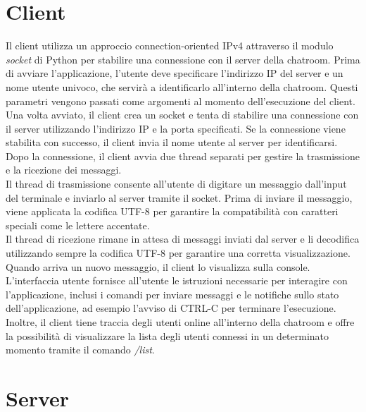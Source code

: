 \documentclass[a4paper,12pt]{report}
\begin{document}
\chapter{Client}
Il client utilizza un approccio connection-oriented IPv4 attraverso il modulo \textit{socket} di Python per stabilire una connessione con il server della chatroom. Prima di avviare l'applicazione, l'utente deve specificare l'indirizzo IP del server e un nome utente univoco, che servirà a identificarlo all'interno della chatroom. Questi parametri vengono passati come argomenti al momento dell'esecuzione del client.
\\
Una volta avviato, il client crea un socket e tenta di stabilire una connessione con il server utilizzando l'indirizzo IP e la porta specificati. Se la connessione viene stabilita con successo, il client invia il nome utente al server per identificarsi.
\\
Dopo la connessione, il client avvia due thread separati per gestire la trasmissione e la ricezione dei messaggi. 
\\
Il thread di trasmissione consente all'utente di digitare un messaggio dall'input del terminale e inviarlo al server tramite il socket. Prima di inviare il messaggio, viene applicata la codifica UTF-8 per garantire la compatibilità con caratteri speciali come le lettere accentate.
\\
Il thread di ricezione rimane in attesa di messaggi inviati dal server e li decodifica utilizzando sempre la codifica UTF-8 per garantire una corretta visualizzazione. Quando arriva un nuovo messaggio, il client lo visualizza sulla console.
\\
L'interfaccia utente fornisce all'utente le istruzioni necessarie per interagire con l'applicazione, inclusi i comandi per inviare messaggi e le notifiche sullo stato dell'applicazione, ad esempio l'avviso di CTRL-C per terminare l'esecuzione.
\\
Inoltre, il client tiene traccia degli utenti online all'interno della chatroom e offre la possibilità di visualizzare la lista degli utenti connessi in un determinato momento tramite il comando \textit{/list}.
\chapter{Server}
\end{document}
